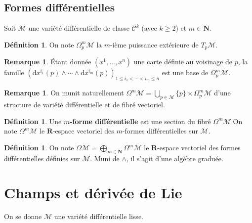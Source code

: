 \documentclass[12pt,a4paper]{article}
\theoremstyle{definition}
\newtheorem{defn}[thm]{Définition}
\newtheorem{rqe}[thm]{Remarque}
\begin{document}
\subsection{Formes différentielles}
Soit $\mathcal{M}$ une variété différentielle de classe $\mathcal{C}^k$ (avec $k\geqslant 2$) et $m\in\mathbf{N}$.
\begin{defn}
On note $\Omega^m_p\mathcal{M}$ la $m$-ième puissance extérieure de $T_p\mathcal{M}$.
\end{defn}
\begin{rqe}
Étant donnée $(x^1,\ldots,x^n)$ une carte définie au voisinage de $p$, la famille $\left(\mathrm{d}x^{i_1}(p)\wedge\cdots\wedge\mathrm{d}x^{i_m}(p)\right)_{1\leqslant i_1<\cdots<i_m\leqslant n}$ est une base de $\Omega^m_p\mathcal{M}$.
\end{rqe}
\begin{rqe}
On munit naturellement $\displaystyle\Omega^m\mathcal{M}=\bigcup_{p\in\mathcal{M}}\{p\}\times\Omega^m_p\mathcal{M}$ d'une structure de variété différentielle et de fibré vectoriel.
\end{rqe}
\begin{defn}
Une \textbf{$m$-forme différentielle} est une section du fibré $\Omega^m\mathcal{M}$.\newline On note $\Omega^m\mathcal{M}$ le $\mathbf{R}$-espace vectoriel des $m$-formes différentielles sur $\mathcal{M}$.
\end{defn}
\begin{defn}
On note $\displaystyle\Omega\mathcal{M}=\bigoplus_{m\in\mathbf{N}}\Omega^m\mathcal{M}$ le $\mathbf{R}$-espace vectoriel des formes différentielles définies sur $\mathcal{M}$. Muni de $\wedge$, il s'agit d'une algèbre graduée.
\end{defn}
\newpage
\section{Champs et dérivée de Lie}
On se donne $\mathcal{M}$ une variété différentielle lisse.
\end{document}
